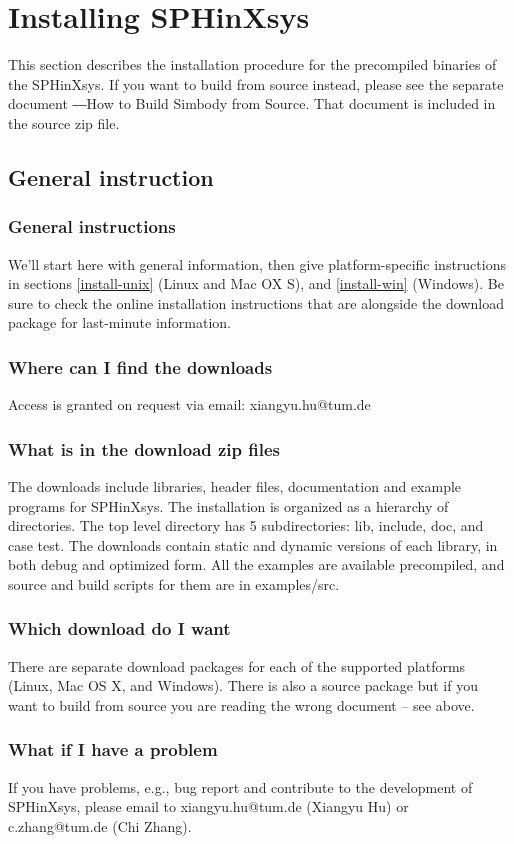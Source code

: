 \documentclass[12pt, a4paper,onecolumn]{article}
\begin{document}
\section{Installing SPHinXsys}\label{install}
This section describes the installation procedure for the precompiled binaries of the SPHinXsys. 
If you want to build from source instead, please see the separate document ―How to Build Simbody from Source. 
That document is included in the source zip file.
\subsection{General instruction}
\subsubsection{General instructions}
We’ll start here with general information, then give platform-specific instructions in sections \ref{install-unix} (Linux and Mac OX S), and \ref{install-win} (Windows).
Be sure to check the online installation instructions that are alongside the download package for last-minute information.
\subsubsection{Where can I find the downloads}
Access is granted on request via email: xiangyu.hu@tum.de
\subsubsection{What is in the download zip files}
The downloads include libraries, header files, documentation and example programs for SPHinXsys. 
The installation is organized as a hierarchy of directories. 
The top level directory has 5 subdirectories: lib, include, doc, and case test. 
The downloads contain static and dynamic versions of each library, in both debug and optimized form. 
All the examples are available precompiled, and source and build scripts for them are in examples/src. 
\subsubsection{Which download do I want}
There are separate download packages for each of the supported platforms (Linux, Mac OS X, and Windows).
There is also a source package but if you want to build from source you are reading the wrong document – see above.
\subsubsection{What if I have a problem}
If you have problems, e.g., bug report and contribute to the development of SPHinXsys, 
please email to xiangyu.hu@tum.de (Xiangyu Hu) or c.zhang@tum.de (Chi Zhang).
\end{document}
